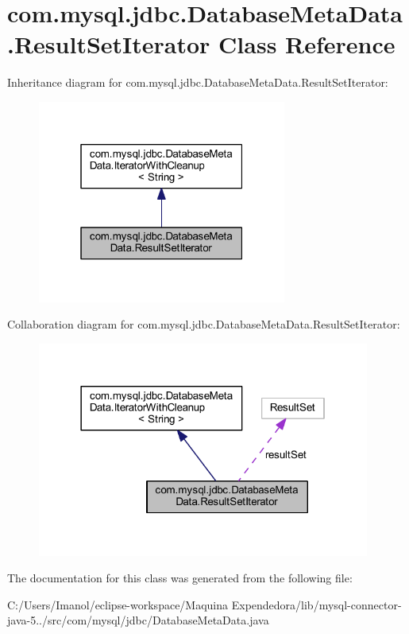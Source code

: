 \hypertarget{classcom_1_1mysql_1_1jdbc_1_1_database_meta_data_1_1_result_set_iterator}{}\section{com.\+mysql.\+jdbc.\+Database\+Meta\+Data.\+Result\+Set\+Iterator Class Reference}
\label{classcom_1_1mysql_1_1jdbc_1_1_database_meta_data_1_1_result_set_iterator}


Inheritance diagram for com.\+mysql.\+jdbc.\+Database\+Meta\+Data.\+Result\+Set\+Iterator\+:
\nopagebreak
\begin{figure}[H]
\begin{center}
\leavevmode
\includegraphics[width=232pt]{classcom_1_1mysql_1_1jdbc_1_1_database_meta_data_1_1_result_set_iterator__inherit__graph}
\end{center}
\end{figure}


Collaboration diagram for com.\+mysql.\+jdbc.\+Database\+Meta\+Data.\+Result\+Set\+Iterator\+:
\nopagebreak
\begin{figure}[H]
\begin{center}
\leavevmode
\includegraphics[width=310pt]{classcom_1_1mysql_1_1jdbc_1_1_database_meta_data_1_1_result_set_iterator__coll__graph}
\end{center}
\end{figure}


The documentation for this class was generated from the following file\+:\begin{DoxyCompactItemize}
\item 
C\+:/\+Users/\+Imanol/eclipse-\/workspace/\+Maquina Expendedora/lib/mysql-\/connector-\/java-\/5../src/com/mysql/jdbc/Database\+Meta\+Data.\+java\end{DoxyCompactItemize}
